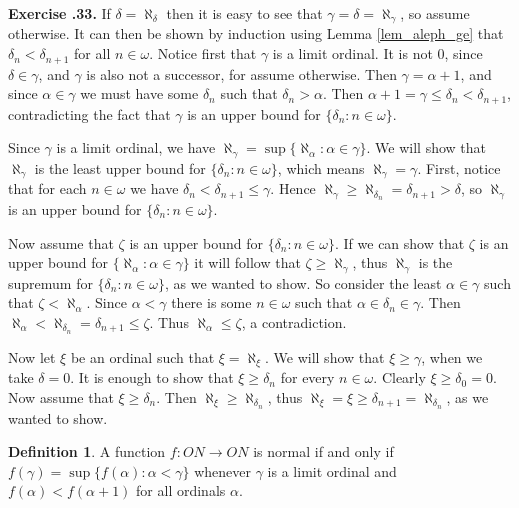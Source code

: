 \documentclass{report}
\theoremstyle{definition}
\newtheorem{definition}{Definition}[section]
\theoremstyle{remark}
\newenvironment{exc}[1]{\noindent\textbf{Exercise \thesection.#1.}}{\medskip}
\newcommand{\set}[1]{\{#1\}}
\begin{document}
\begin{exc}{33}
    If $\delta = \aleph_\delta$ then it is easy to see that $\gamma = \delta = \aleph_\gamma$, so assume otherwise. It can then be shown by induction using Lemma \ref{lem_aleph_ge} that $\delta_n < \delta_{n+1}$ for all $n \in \omega$. Notice first that $\gamma$ is a limit ordinal. It is not $0$, since $\delta \in \gamma$, and $\gamma$ is also not a successor, for assume otherwise. Then $\gamma = \alpha + 1$, and since $\alpha \in \gamma$ we must have some $\delta_n$ such that $\delta_n > \alpha$. Then $\alpha + 1 = \gamma \le \delta_n < \delta_{n+1}$, contradicting the fact that $\gamma$ is an upper bound for $\set{\delta_n : n \in \omega}$.
    
    Since $\gamma$ is a limit ordinal, we have $\aleph_\gamma = \sup\set{\aleph_\alpha : \alpha \in \gamma}$. We will show that $\aleph_\gamma$ is the least upper bound for $\set{\delta_n : n \in \omega}$, which means $\aleph_\gamma = \gamma$. First, notice that for each $n \in \omega$ we have $\delta_n < \delta_{n+1} \le \gamma$. Hence $\aleph_\gamma \ge \aleph_{\delta_n} = \delta_{n+1} > \delta$, so $\aleph_\gamma$ is an upper bound for $\set{\delta_n : n \in \omega}$.
    
    Now assume that $\zeta$ is an upper bound for $\set{\delta_n : n \in \omega}$. If we can show that $\zeta$ is an upper bound for $\set{\aleph_\alpha : \alpha \in \gamma}$ it will follow that $\zeta \ge \aleph_\gamma$, thus $\aleph_\gamma$ is the supremum for $\set{\delta_n : n \in \omega}$, as we wanted to show. So consider the least $\alpha \in \gamma$ such that $\zeta < \aleph_\alpha$. Since $\alpha < \gamma$ there is some $n \in \omega$ such that $\alpha \in \delta_n \in \gamma$. Then $\aleph_\alpha < \aleph_{\delta_n} = \delta_{n+1} \le \zeta$. Thus $\aleph_\alpha \le \zeta$, a contradiction.
    
    Now let $\xi$ be an ordinal such that $\xi = \aleph_\xi$. We will show that $\xi \geq \gamma$, when we take $\delta = 0$. It is enough to show that $\xi \geq \delta_n$ for every $n \in \omega$. Clearly $\xi \geq \delta_0 = 0$. Now assume that $\xi \geq \delta_n$. Then $\aleph_\xi \geq \aleph_{\delta_n}$, thus $\aleph_\xi = \xi \geq \delta_{n+1} = \aleph_{\delta_n}$, as we wanted to show.
\end{exc}

\begin{definition}
    A function $f : ON \to ON$ is normal if and only if $f(\gamma) = \sup\set{f(\alpha) : \alpha < \gamma}$ whenever $\gamma$ is a limit ordinal and $f(\alpha) < f (\alpha + 1)$ for all ordinals $\alpha$.
\end{definition}
\end{document}
